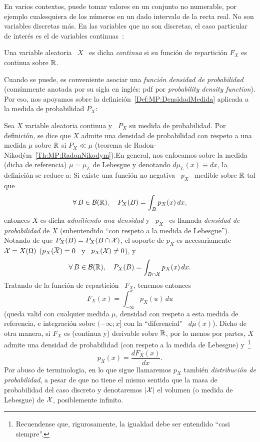 
\label{Ssec:MP:VAContinua}

En  varios contextos,  puede  tomar valores  en  un conjunto  no numerable,  por
ejemplo cualesquiera de los n\'umeros en un dado intervalo de la recta real.  No
son variables  discretas m\'as. En las  variables que no son  discretas, el caso
particular de inter\'es es el de variables continuas~\cite{AthLah06, HogMck13}:
%
\begin{definicion}
  Una variable  aleatoria \  $X$ \ es  dicha {\it  continua} si su  funci\'on de
  repartici\'on  $F_X$ es  continua sobre  $\mathbb{R}$.
\end{definicion}

Cuando  se  puede,  es  conveniente  asociar  una  {\it  funci\'on  densidad  de
  probabilidad} (com\'unmente  anotada por  su sigla en  ingl\'es: pdf  por {\it
  probability   density   function}).   Por   eso,   nos   apoyamos   sobre   la
definici\'on~\ref{Def:MP:DensidadMedida}  aplicada a  la medida  de probabilidad
$P_X$:
%
\begin{definicion}
  Sea $X$ variable  aleatoria continua y \ $P_X$ su  medida de probabilidad. Por
  definici\'on, se dice que $X$  admite una densidad de probabilidad con respeto
  a   una  medida   $\mu$  sobre   $\mathbb{R}$  si   $P_X  \ll   \mu$   (teorema  de
  Radon-Nikod\'ym~\ref{Th:MP:RadonNikodym}).\newline En  general, nos enfocamos
  sobre la  medida (dicha de referencia)  $\mu = \mu_L$ de  Lebesgue y denotando
  $d\mu_L(x) \equiv dx$, la definici\'on se reduce a: Si existe una funci\'on no
  negativa \ $p_X$ \ medible sobre $\mathbb{R}$ tal que
  \[
  \forall \, B \in \mathcal{B}(\mathbb{R}), \quad P_X(B) = \int_B p_X(x) \, dx,
  \]
  entonces $X$  es dicha {\it  admitiendo una densidad}  y \ $p_X$ \  es llamada
  {\it densidad de probabilidad} de  $X$ (subentendido ``con respeto a la medida
  de Lebesgue'').  Notando de que $P_X(B) = P_X(B \cap \mathcal{X})$, el soporte de $p_X$
  es necesariamente $\mathcal{X} = X(\Omega)$ (\ie $p_X(\widebar{\X}) = 0$ \ y \ $p_X(\mathcal{X})
  \ne 0$), y
  \[
  \forall \, B \in \mathcal{B}(\mathbb{R}), \quad P_X(B) = \int_{B \cap \mathcal{X}} p_X(x) \, dx.
  \]
  Tratando de la funci\'on de repartici\'on \ $F_X$, tenemos entonces
  \[
  F_X(x) = \int_{-\infty}^x p_X(u) \, du
  \]
  (queda valid con cualquier medida $\mu$, densidad con respeto a esta medida de
  referencia,  e integraci\'on  sobre $(-\infty;  x]$ con  la  ``diferencial'' \
  $d\mu(x)$).  Dicho  de otra manera, si  $F_X$ es (continua  y) derivable sobre
  $\mathbb{R}$, por lo menos por partes, $X$ admite una densidad de probabilidad (con
  respeto a  la medida de Lebesgue)  y~\footnote{Recuendense que, rigurosamente,
    la igualdad debe ser entendido ``casi siempre''.}
  \[
  p_X(x) = \frac{d F_X(x)}{dx}.
  \]
  Por abuso  de terminologia,  en lo que  sigue llamaremos $p_X$  tambi\'en {\it
    distribuci\'on de  probabilidad}, a pesar de  que no tiene  el mismo sentido
  que la masa de probabilidad del  caso discreto y denotaremos $|\mathcal{X}|$ el volumen
  (o medida de Lebesgue) de $\mathcal{X}$, posiblemente infinito.
\end{definicion}
